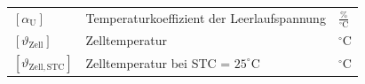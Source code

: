 \begin{tabular}{@{} l p{7cm} l @{}}
    $[\alpha_{\mathrm{U}}]$                      & Temperaturkoeffizient der Leerlaufspannung \dotfill                           & $\frac{\%}{^\circ\mathrm{C}}$ \\
    $[\vartheta_{\mathrm{Zell}}]$                & Zelltemperatur \dotfill                                                       & $^\circ\mathrm{C}$ \\
    $[\vartheta_{\mathrm{Zell},\mathrm{STC}}]$   & Zelltemperatur bei STC = $25^\circ\mathrm{C}$ \dotfill                        & $^\circ\mathrm{C}$ \\
\end{tabular}